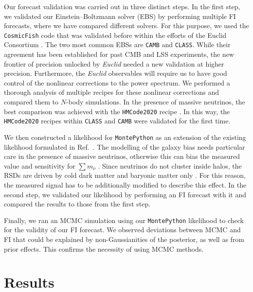 \documentclass[a4paper,11pt]{article}
\newcommand{\euclid}{\textit{Euclid}\xspace}
\newcommand{\summnu}{\sum m_\nu}
\newcommand{\camb}{\texttt{CAMB}\xspace}
\newcommand{\class}{\texttt{CLASS}\xspace}
\newcommand{\montepython}{\texttt{MontePython}\xspace}
\newcommand{\cosmicfish}{\texttt{CosmicFish}\xspace}
\begin{document}
Our forecast validation was carried out in three distinct steps. In the first step, we validated our Einstein--Boltzmann solver (EBS) by performing multiple FI forecasts, where we have compared different solvers. For this purpose, we used the \cosmicfish code that was validated before within the efforts of the Euclid Consortium \cite{Blanchard-EP7}. The two most common EBSs are \camb \cite{2011ascl.soft02026L} and \class \cite{Diego_Blas_2011}. While their agreement has been established for past CMB and LSS experiments, the new frontier of precision unlocked by \euclid needed a new validation at higher precision. Furthermore, the \euclid observables will require us to have good control of the nonlinear corrections to the power spectrum. We performed a thorough analysis of multiple recipes for these nonlinear corrections and compared them to $N$-body simulations. In the presence of massive neutrinos, the best comparison was achieved with the \texttt{HMCode2020} recipe \cite{Mead_2021}. In this way, the \texttt{HMCode2020} recipes within \class and \camb were validated for the first time.

We then constructed a likelihood for \montepython \cite{Audren:2012wb} as an extension of the existing likelihood formulated in Ref.~\cite{Casas23}. The modelling of the galaxy bias needs particular care in the presence of massive neutrinos, otherwise this can bias the measured value and sensitivity for $\summnu$ \cite{Vagnozzi_2018}. Since neutrinos do not cluster inside halos, the RSDs are driven by cold dark matter and baryonic matter only \cite{Villaescusa_Navarro_2018}. For this reason, the measured signal has to be additionally modified to describe this effect. In the second step, we validated our likelihood by performing an FI forecast with it and compared the results to those from the first step.

Finally, we ran an MCMC simulation using our \montepython likelihood to check for the validity of our FI forecast. We observed deviations between MCMC and FI that could be explained by non-Gaussianities of the posterior, as well as from prior effects. This confirms the necessity of using MCMC methods. 

\section{Results}
\end{document}
